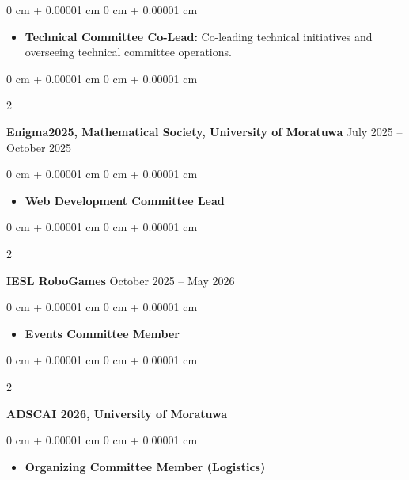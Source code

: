 \documentclass[10pt, letterpaper]{article}
\newenvironment{highlights}{
    \begin{itemize}[
        topsep=0.10 cm,
        parsep=0.10 cm,
        partopsep=0pt,
        itemsep=0pt,
        leftmargin=0 cm + 10pt
    ]
}{
    \end{itemize}
} %
\newenvironment{onecolentry}{
    \begin{adjustwidth}{
        0 cm + 0.00001 cm
    }{
        0 cm + 0.00001 cm
    }
}{
    \end{adjustwidth}
} %
\newenvironment{twocolentry}[2][]{
    \onecolentry
    \def\secondColumn{#2}
    \setcolumnwidth{\fill, 4.5 cm}
    \begin{paracol}{2}
}{
    \switchcolumn \raggedleft \secondColumn
    \end{paracol}
    \endonecolentry
} %
\begin{document}
        \vspace{0.10 cm}
        \begin{onecolentry}
            \begin{highlights}
                \item \textbf{Technical Committee Co-Lead:} Co-leading technical initiatives and overseeing technical committee operations.
            \end{highlights}
        \end{onecolentry}

        \vspace{0.30 cm}
        \begin{twocolentry}{
            July 2025 – October 2025
        }
            \textbf{Enigma2025, Mathematical Society, University of Moratuwa}\end{twocolentry}

        \vspace{0.10 cm}
        \begin{onecolentry}
            \begin{highlights}
                \item \textbf{Web Development Committee Lead}
            \end{highlights}
        \end{onecolentry}

        \vspace{0.30 cm}
        \begin{twocolentry}{
            October 2025 – May 2026
        }
            \textbf{IESL RoboGames}\end{twocolentry}

        \vspace{0.10 cm}
        \begin{onecolentry}
            \begin{highlights}
                \item \textbf{Events Committee Member}
            \end{highlights}
        \end{onecolentry}

        \vspace{0.30 cm}
        \begin{twocolentry}{
            2026
        }
            \textbf{ADSCAI 2026, University of Moratuwa}\end{twocolentry}

        \vspace{0.10 cm}
        \begin{onecolentry}
            \begin{highlights}
                \item \textbf{Organizing Committee Member (Logistics)}
            \end{highlights}
        \end{onecolentry}
\end{document}
